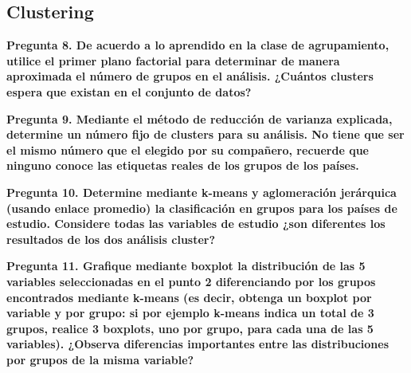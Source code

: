 \documentclass[
]{article}
\begin{document}
\subsection{Clustering}\label{clustering}

\noindent\textbf{Pregunta 8. De acuerdo a lo aprendido en la clase de agrupamiento, utilice el primer plano factorial para determinar de manera aproximada el número de grupos en el análisis. ¿Cuántos clusters espera que existan en el conjunto de datos?}

\noindent\textbf{Pregunta 9. Mediante el método de reducción de varianza explicada, determine un número fijo de clusters para su análisis. No tiene que ser el mismo número que el elegido por su compañero, recuerde que ninguno conoce las etiquetas reales de los grupos de los países.}

\noindent\textbf{Pregunta 10. Determine mediante k-means y aglomeración jerárquica (usando enlace promedio) la clasificación en grupos para los países de estudio. Considere todas las variables de estudio ¿son diferentes los resultados de los dos análisis cluster?}

\noindent\textbf{Pregunta 11. Grafique mediante boxplot la distribución de las 5 variables seleccionadas en el punto 2 diferenciando por los grupos encontrados mediante k-means (es decir, obtenga un boxplot por variable y por grupo: si por ejemplo k-means indica un total de 3 grupos, realice 3 boxplots, uno por grupo, para cada una de las 5 variables). ¿Observa diferencias importantes entre las distribuciones por grupos de la misma variable?}
\end{document}
